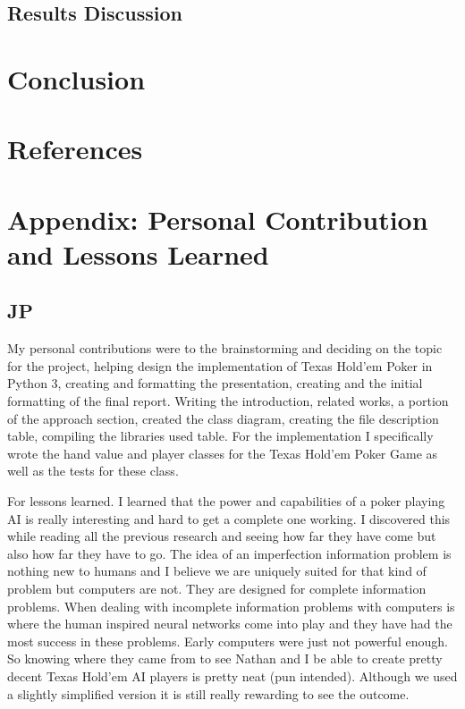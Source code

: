 \subsection{Results Discussion}

\section{Conclusion}


\section{References}
\printbibliography

\section{Appendix: Personal Contribution and Lessons Learned}
\subsection{JP}
My personal contributions were to the brainstorming and deciding on the topic for the project, helping design the implementation of Texas Hold'em Poker in Python 3, creating and formatting the presentation, creating and the initial formatting of the final report. Writing the introduction, related works, a portion of the approach section, created the class diagram, creating the file description table, compiling the libraries used table. For the implementation I specifically wrote the hand value and player classes for the Texas Hold'em Poker Game as well as the tests for these class.

For lessons learned. I learned that the power and capabilities of a poker playing AI is really interesting and hard to get a complete one working. I discovered this while reading all the previous research and seeing how far they have come but also how far they have to go. The idea of an imperfection information problem is nothing new to humans and I believe we are uniquely suited for that kind of problem but computers are not. They are designed for complete information problems. When dealing with incomplete information problems with computers is where the human inspired neural networks come into play and they have had the most success in these problems. Early computers were just not powerful enough. So knowing where they came from to see Nathan and I be able to create pretty decent Texas Hold'em AI players is pretty neat (pun intended). Although we used a slightly simplified version it is still really rewarding to see the outcome. 

